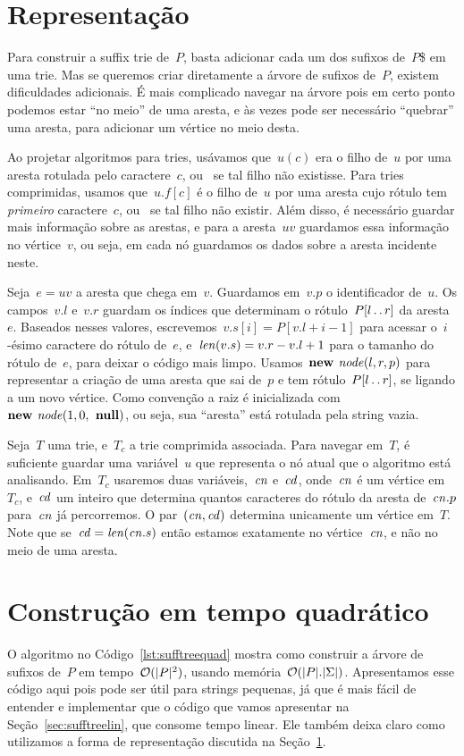 \section{Representação}
\label{sec:sufftreerepr}

Para construir a suffix trie de~$P$, basta adicionar cada um dos sufixos de~$P$\$ em uma trie. Mas se queremos criar diretamente a árvore de sufixos de~$P$, existem dificuldades adicionais. É mais complicado navegar na árvore pois em certo ponto podemos estar ``no meio'' de uma aresta, e às vezes pode ser necessário ``quebrar'' uma aresta, para adicionar um vértice no meio desta.

Ao projetar algoritmos para tries, usávamos que~$u(c)$ era o filho de~$u$ por uma aresta rotulada pelo caractere~$c$, ou~ se tal filho não existisse. Para tries comprimidas, usamos que~$u.f[c]$ é o filho de~$u$ por uma aresta cujo rótulo tem \emph{primeiro} caractere~$c$, ou~ se tal filho não existir. Além disso, é necessário guardar mais informação sobre as arestas, e para a aresta~$uv$ guardamos essa informação no vértice~$v$, ou seja, em cada nó guardamos os dados sobre a aresta incidente neste.

Seja~$e = uv$ a aresta que chega em~$v$. Guardamos em~$v.p$ o identificador de~$u$. Os campos~$v.l$ e~$v.r$ guardam os índices que determinam o rótulo~$P[l\,.\,.\, r]$ da aresta~$e$. Baseados nesses valores, escrevemos~${v.s[i] = P[v.l + i - 1]}$ para acessar o~$i$-ésimo caractere do rótulo de~$e$, e~${\mathit{len}(v.s) = v.r - v.l + 1}$ para o tamanho do rótulo de~$e$, para deixar o código mais limpo. Usamos~${\textbf{new } \mathit{node}(l, r, p)}$ para representar a criação de uma aresta que sai de~$p$ e tem rótulo~$P[l\,.\,.\, r]$, se ligando a um novo vértice. Como convenção a raiz é inicializada com~$\textbf{new } \mathit{node}(1, 0, \textbf{ null})$, ou seja, sua ``aresta'' está rotulada pela string vazia.

Seja~$T$ uma trie, e~$T_c$ a trie comprimida associada. Para navegar em~$T$, é suficiente guardar uma variável~$u$ que representa o nó atual que o algoritmo está analisando. Em~$T_c$ usaremos duas variáveis,~$\mathit{cn}$ e~$\mathit{cd}$, onde~$\mathit{cn}$ é um vértice em~$T_c$, e~$\mathit{cd}$ um inteiro que determina quantos caracteres do rótulo da aresta de~$\mathit{cn}.p$ para~$\mathit{cn}$ já percorremos. O par~$(\mathit{cn}, \mathit{cd})$ determina unicamente um vértice em~$T$. Note que se~$\mathit{cd} = \mathit{len}(\mathit{cn}.s)$ então estamos exatamente no vértice~$\mathit{cn}$, e não no meio de uma aresta.
 
\section{Construção em tempo quadrático}
O algoritmo no Código~\ref{lst:sufftreequad} mostra como construir a árvore de sufixos de~$P$ em tempo~$\mathcal{O}(|P|^2)$, usando memória~$\mathcal{O}(|P|.|\Sigma|)$. Apresentamos esse código aqui pois pode ser útil para strings pequenas, já que é mais fácil de entender e implementar que o código que vamos apresentar na Seção~\ref{sec:sufftreelin}, que consome tempo linear. Ele também deixa claro como utilizamos a forma de representação discutida na Seção~\ref{sec:sufftreerepr}. 

